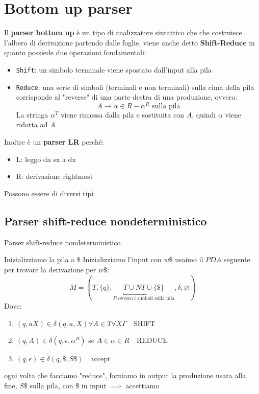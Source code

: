 \chapter{Bottom up parser}

Il \textbf{parser bottom up} è un tipo di analizzatore sintattico che che costruisce l'albero di derivazione partendo dalle foglie, viene anche detto \textbf{Shift-Reduce} in quanto possiede due operazioni fondamentali:
\begin{itemize}
    \item \texttt{Shift}: un simbolo terminale viene spostato dall'input alla pila 
    \item \texttt{Reduce}: una serie di simboli (terminali e non terminali) sulla cima della pila corrisponde al "reverse" di una parte destra di una produzione, ovvero:
    \[
        A\to\alpha \in R - \alpha^R \text{ sulla pila}
    \]
    La stringa $\alpha^T$ viene rimossa dalla pila e sostituita con $A$, quindi $\alpha$ viene ridotta ad $A$
\end{itemize}

Inoltre è un \textbf{parser LR} perché:
\begin{itemize}
    \item L: leggo da sx a dx
    \item R: derivazione rightmost
\end{itemize}
 
Possono essere di diversi tipi

\section{Parser shift-reduce nondeterministico}
\begin{algorithm}
    \caption{Parser shift-reduce nondeterministico}

    Inizializziamo la pila a $\$$\;
    Inizializziamo l'input con $w\$$\;
    usaimo il $PDA$ seguente per trovare la derivazione per $w\$$:
    \[
        M=(T, \{q\},\underbracket{T\cup NT \cup \{\$\}}_{\Gamma: \text{ovvero i simboli sulla pila}}, \delta, \varnothing)
    \]
    Dove:
    \begin{enumerate}
        \item $(q,aX)\in \delta (q,a,X)\forall A\in T\forall X\Gamma\quad \text{SHIFT}$
        \item $(q,A)\in\delta(q,\epsilon, \alpha^R)$ se $A\in \alpha\in R\quad \text{REDUCE}$
        \item $(q,\epsilon)\in \delta(q,\$,S\$)\quad \text{accept}$
    \end{enumerate}\;
    ogni volta che facciamo "reduce", forniamo in output la produzione usata\;
    alla fine, $S\$$ sulla pila, con $\$$ in input $\implies$ accettiamo\;
\end{algorithm}

